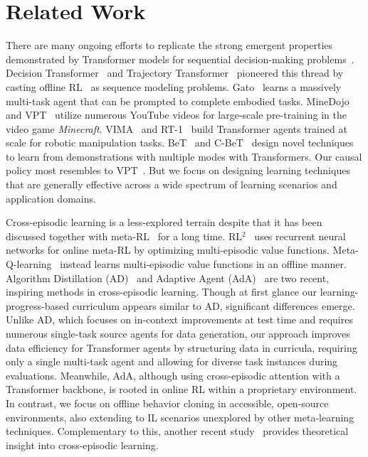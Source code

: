 \section{Related Work}
\label{sec:related_work}

There are many ongoing efforts to replicate the strong emergent properties demonstrated by Transformer models for sequential decision-making problems~\citep{yang2023foundation}.
Decision Transformer~\citep{chen2021decisiontransformer} and Trajectory Transformer~\citep{janner2021onebigsequence} pioneered this thread by casting offline RL~\citep{levine2020offline} as sequence modeling problems.
Gato~\citep{reed2022gato} learns a massively multi-task agent that can be prompted to complete embodied tasks.
MineDojo~\citep{fan2022minedojo} and VPT~\citep{openai2022vpt} utilize numerous YouTube videos for large-scale pre-training in the video game \textit{Minecraft}.
VIMA~\citep{jiang2022vima} and RT-1~\citep{brohan2022rt1} build Transformer agents trained at scale for robotic manipulation tasks.
BeT~\citep{shafiullah2022behavior} and C-BeT~\citep{cui2022play} design novel techniques to learn from demonstrations with multiple modes with Transformers.
Our causal policy most resembles to VPT~\citep{openai2022vpt}. But we focus on designing learning techniques that are generally effective across a wide spectrum of learning scenarios and application domains.


\vspace{-0.5em}

Cross-episodic learning is a less-explored terrain despite that it has been discussed together with meta-RL~\citep{wang2016learning} for a long time.
RL$^2$~\citep{duan2016rl2} uses recurrent neural networks for online meta-RL by optimizing multi-episodic value functions.
Meta-Q-learning~\citep{fakoor2019metaqlearning} instead learns multi-episodic value functions in an offline manner.
Algorithm Distillation (AD)~\citep{laskin2023incontext} and Adaptive Agent (AdA)~\citep{team2023humantimescale} are two recent, inspiring methods in cross-episodic learning. 
Though at first glance our learning-progress-based curriculum appears similar to AD, significant differences emerge. Unlike AD, which focuses on in-context improvements at test time and requires numerous single-task source agents for data generation, our approach improves data efficiency for Transformer agents by structuring data in curricula, requiring only a single multi-task agent and allowing for diverse task instances during evaluations. 
Meanwhile, AdA, although using cross-episodic attention with a Transformer backbone, is rooted in online RL within a proprietary environment. 
In contrast, we focus on offline behavior cloning in accessible, open-source environments, also extending to IL scenarios unexplored by other meta-learning techniques. 
Complementary to this, another recent study~\citep{lee2023supervised} provides theoretical insight into cross-episodic learning.


